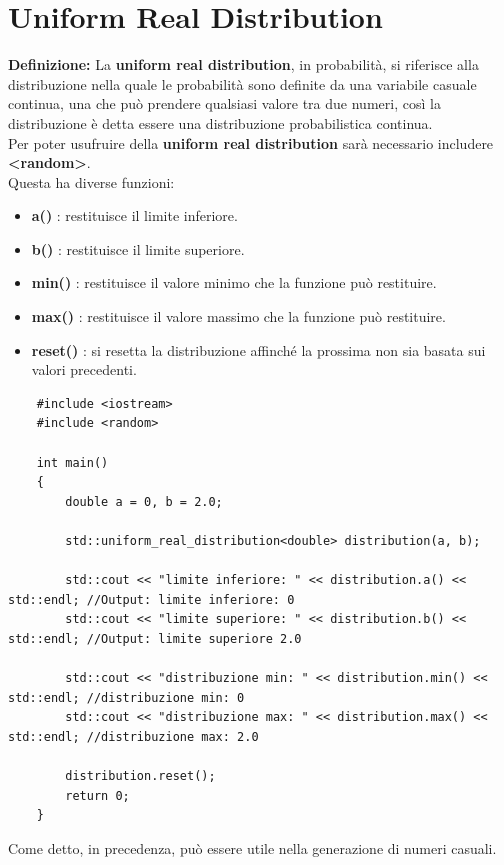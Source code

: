 
\newpage

\section{Uniform Real Distribution}

\textsf{\small \textbf{Definizione: } La \textbf{uniform real distribution}, in probabilità, si riferisce alla distribuzione nella quale le probabilità sono definite da una variabile casuale continua, una che può prendere qualsiasi valore tra due numeri, così la distribuzione è detta essere una distribuzione probabilistica continua. } \\

\textsf{\small Per poter usufruire della \textbf{uniform real distribution} sarà necessario includere \textbf{<random>}.} \\ 

\textsf{\small Questa ha diverse funzioni: } \\

\begin{itemize}
	\item \textsf{\small \textbf{a()} : restituisce il limite inferiore.}
	\item \textsf{\small \textbf{b()} : restituisce il limite superiore.}
	\item \textsf{\small \textbf{min()} : restituisce il valore minimo che la funzione può restituire.}
	\item \textsf{\small \textbf{max()} : restituisce il valore massimo che la funzione può restituire.}
	\item \textsf{\small \textbf{reset()} : si resetta la distribuzione affinché la prossima non sia basata sui valori precedenti.}
\end{itemize}

\begin{lstlisting}
	#include <iostream>
	#include <random>
	
	int main()
	{
		double a = 0, b = 2.0;
		
		std::uniform_real_distribution<double> distribution(a, b);
		
		std::cout << "limite inferiore: " << distribution.a() << std::endl; //Output: limite inferiore: 0
		std::cout << "limite superiore: " << distribution.b() << std::endl; //Output: limite superiore 2.0
		
		std::cout << "distribuzione min: " << distribution.min() << std::endl; //distribuzione min: 0
		std::cout << "distribuzione max: " << distribution.max() << std::endl; //distribuzione max: 2.0
		
		distribution.reset(); 
		return 0;
	}
\end{lstlisting}

\textsf{\small Come detto, in precedenza, può essere utile nella generazione di numeri casuali.} \\


